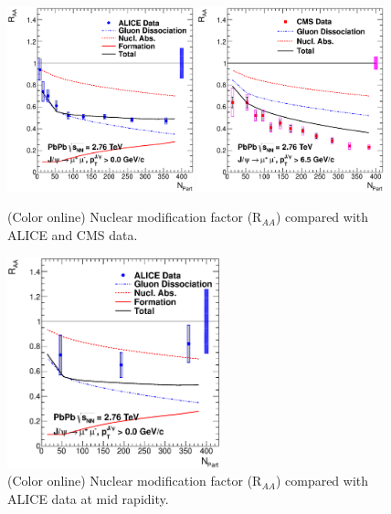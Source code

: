 \documentclass[aps,prc,preprint,superscriptaddress,showpacs,showkeys]{revtex4-1}
\begin{document}
\begin{figure}
\includegraphics[width=0.48\textwidth]{ALICE_RAA.eps}
\includegraphics[width=0.48\textwidth]{CMS_RAA_JPsi.eps}
\caption{(Color online) Nuclear modification factor (R$_{AA}$) compared with ALICE and CMS data.}
\label{fig:JPsiRaa}
\end{figure}

\begin{figure}
\includegraphics[width=0.55\textwidth]{ALICEMid_RAA.eps}
\caption{(Color online) Nuclear modification factor (R$_{AA}$) compared with ALICE data at mid
rapidity.}
\label{fig:JPsiRaaALICEMid}
\end{figure}
\end{document}
